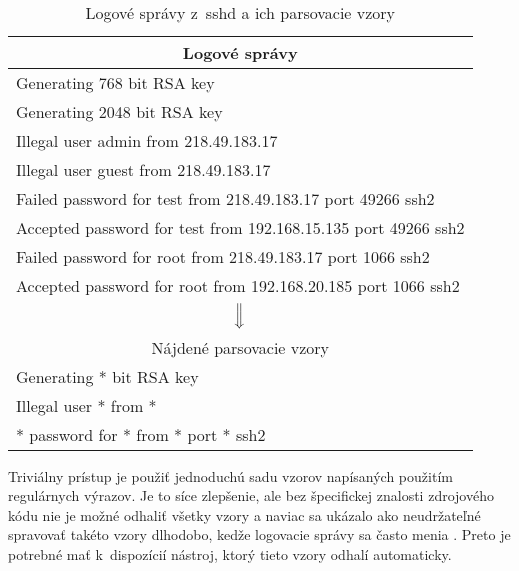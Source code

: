 \begin{table}[htbp]
\centering
\begin{tabularx}{\textwidth}{X}
\multicolumn{1}{c}{Logové správy}                                                                 \\ \hline
Generating 768 bit RSA key                                     \\
Generating 2048 bit RSA key                                    \\
Illegal user admin from 218.49.183.17                          \\
Illegal user guest from 218.49.183.17                          \\
Failed password for test from 218.49.183.17 port 49266 ssh2    \\
Accepted password for test from 192.168.15.135 port 49266 ssh2 \\
Failed password for root from 218.49.183.17 port 1066 ssh2     \\
Accepted password for root from 192.168.20.185 port 1066 ssh2  \\
\multicolumn{1}{c}{\multirow{2}{*}{ $\Big\Downarrow$ }}                                                             \\
\multicolumn{1}{c}{}                                                                              \\
\multicolumn{1}{c}{Nájdené parsovacie vzory}                                                      \\ \hline
Generating * bit RSA key                                      \\
Illegal user * from *                                          \\
* password for * from * port * ssh2                           
\end{tabularx}
\caption{Logové správy z~sshd a ich parsovacie vzory}
\label{tab:a}
\end{table}

\par Triviálny prístup je použiť jednoduchú sadu vzorov napísaných použitím regulárnych výrazov. Je to síce zlepšenie, ale bez špecifickej znalosti zdrojového kódu nie je možné odhaliť všetky vzory a naviac sa ukázalo ako neudržateľné spravovať takéto vzory dlhodobo, kedže logovacie správy sa často menia \parencite{xu2010}. Preto je potrebné mať k~dispozícií nástroj, ktorý tieto vzory odhalí automaticky.








